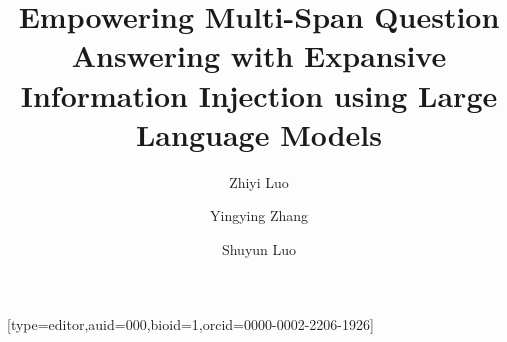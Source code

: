 \documentclass[a4paper,fleqn,twocolumn]{cas-dc}
\newcommand{\1}[1]{\mathds{1}\left[#1\right]}
\begin{document}
\let\WriteBookmarks\relax
\def\floatpagepagefraction{1}
\def\textpagefraction{.001}



\title{Empowering Multi-Span Question Answering with Expansive Information Injection using Large Language Models}  

\author{Zhiyi Luo}[type=editor,auid=000,bioid=1,orcid=0000-0002-2206-1926]

\author{Yingying Zhang}

\author{Shuyun Luo}
\cormark[1]

\address[mymainaddress]{School of Computer Science and Technology and the Key Laboratory of Intelligent Textile and Flexible Interconnection of Zhejiang Province, Zhejiang Sci-Tech University}
\address[mysecondaryaddress]{No. 928, No. 2 street, Baiyang street, Qiantang New District, Hangzhou 310018, China}


%
%
%
%
%
%
%
%
%
\end{document}
